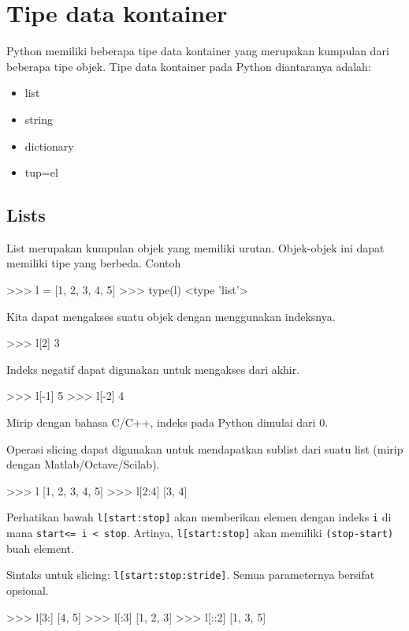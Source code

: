 \section{Tipe data kontainer}
Python memiliki beberapa tipe data kontainer yang merupakan kumpulan
dari beberapa tipe objek. Tipe data kontainer pada Python diantaranya
adalah:
\begin{itemize}
\item list
\item string
\item dictionary
\item tup=el
\end{itemize}

\subsection{Lists}
List merupakan kumpulan objek yang memiliki urutan. Objek-objek ini
dapat memiliki tipe yang berbeda. Contoh
\begin{pyconcode}
>>> l = [1, 2, 3, 4, 5]
>>> type(l)
<type 'list'>
\end{pyconcode}

Kita dapat mengakses suatu objek dengan menggunakan indeksnya.
\begin{pyconcode}
>>> l[2]
3
\end{pyconcode}

Indeks negatif dapat digunakan untuk mengakses dari akhir.
\begin{pyconcode}
>>> l[-1]
5
>>> l[-2]
4
\end{pyconcode}

Mirip dengan bahasa C/C++, indeks pada Python dimulai dari 0.

Operasi slicing dapat digunakan untuk mendapatkan sublist dari
suatu list (mirip dengan Matlab/Octave/Scilab).
\begin{pyconcode}
>>> l
[1, 2, 3, 4, 5]
>>> l[2:4]
[3, 4]
\end{pyconcode}

Perhatikan bawah \texttt{l[start:stop]} akan memberikan
elemen dengan indeks \texttt{i} di mana \texttt{start<= i < stop}.
Artinya, \texttt{l[start:stop]} akan memiliki
\texttt{(stop-start)} buah element.

Sintaks untuk slicing: \texttt{l[start:stop:stride]}.
Semua parameternya bersifat opsional.
\begin{pyconcode}
>>> l[3:]
[4, 5]
>>> l[:3]
[1, 2, 3]
>>> l[::2]
[1, 3, 5]
\end{pyconcode}

